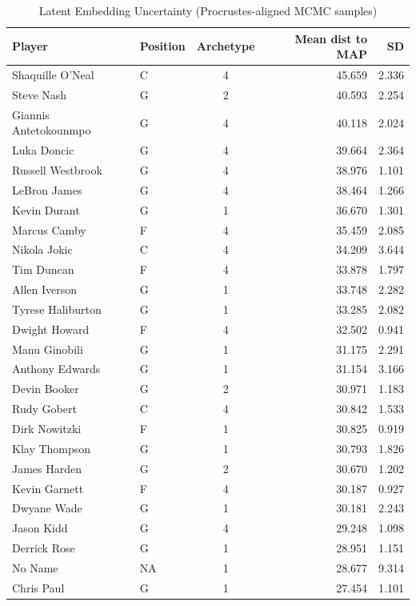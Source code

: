 \begin{table}[t]
\caption*{
{\fontsize{20}{25}\selectfont  Latent Embedding Uncertainty (Procrustes-aligned MCMC samples)\fontsize{12}{15}\selectfont }
} 
\fontsize{12.0pt}{14.0pt}\selectfont
\begin{tabular*}{\linewidth}{@{\extracolsep{\fill}}llcrr}
\toprule
Player & Position & Archetype & Mean dist to MAP & SD \\ 
\midrule\addlinespace[2.5pt]
Shaquille O'Neal & C & 4 & 45.659 & 2.336 \\ 
Steve Nash & G & 2 & 40.593 & 2.254 \\ 
Giannis Antetokounmpo & G & 4 & 40.118 & 2.024 \\ 
Luka Doncic & G & 4 & 39.664 & 2.364 \\ 
Russell Westbrook & G & 4 & 38.976 & 1.101 \\ 
LeBron James & G & 4 & 38.464 & 1.266 \\ 
Kevin Durant & G & 1 & 36.670 & 1.301 \\ 
Marcus Camby & F & 4 & 35.459 & 2.085 \\ 
Nikola Jokic & C & 4 & 34.209 & 3.644 \\ 
Tim Duncan & F & 4 & 33.878 & 1.797 \\ 
Allen Iverson & G & 1 & 33.748 & 2.282 \\ 
Tyrese Haliburton & G & 1 & 33.285 & 2.082 \\ 
Dwight Howard & F & 4 & 32.502 & 0.941 \\ 
Manu Ginobili & G & 1 & 31.175 & 2.291 \\ 
Anthony Edwards & G & 1 & 31.154 & 3.166 \\ 
Devin Booker & G & 2 & 30.971 & 1.183 \\ 
Rudy Gobert & C & 4 & 30.842 & 1.533 \\ 
Dirk Nowitzki & F & 1 & 30.825 & 0.919 \\ 
Klay Thompson & G & 1 & 30.793 & 1.826 \\ 
James Harden & G & 2 & 30.670 & 1.202 \\ 
Kevin Garnett & F & 4 & 30.187 & 0.927 \\ 
Dwyane Wade & G & 1 & 30.181 & 2.243 \\ 
Jason Kidd & G & 4 & 29.248 & 1.098 \\ 
Derrick Rose & G & 1 & 28.951 & 1.151 \\ 
No Name & NA & 1 & 28.677 & 9.314 \\ 
Chris Paul & G & 1 & 27.454 & 1.101 \\ 

\end{tabular*}
\end{table}
